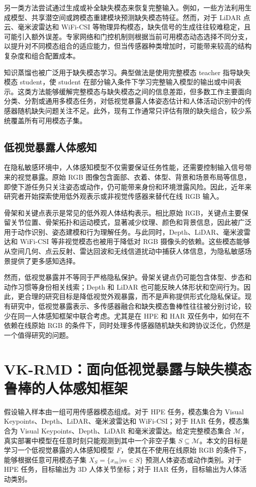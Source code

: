 \documentclass[journal]{IEEEtran}
\begin{document}
另一类方法尝试通过生成或补全缺失模态来恢复完整输入。例如，一些方法利用生成模型、共享潜空间或跨模态重建模块预测缺失模态特征。然而，对于 LiDAR 点云、毫米波雷达和 WiFi-CSI 等物理异构模态，缺失信号的生成往往较难稳定，且可能引入额外误差。专家网络和门控机制则根据当前可用模态动态选择不同分支，以提升对不同模态组合的适应能力，但当传感器种类增加时，可能带来较高的结构复杂度和组合配置成本。

知识蒸馏也被广泛用于缺失模态学习。典型做法是使用完整模态 teacher 指导缺失模态 student，使 student 在部分输入条件下学习完整输入模型的输出或中间表示。这类方法能够缓解完整模态与缺失模态之间的信息差距，但多数工作主要面向分类、分割或通用多模态任务，对低视觉暴露人体姿态估计和人体活动识别中的传感器随机缺失问题关注不足。此外，现有工作通常只评估有限的缺失组合，较少系统覆盖所有可用模态子集。

\subsection{低视觉暴露人体感知}

在隐私敏感环境中，人体感知模型不仅需要保证任务性能，还需要控制输入信号带来的视觉暴露。原始 RGB 图像包含面部、衣着、体型、背景和场景布局等信息，即使下游任务只关注姿态或动作，仍可能带来身份和环境泄露风险。因此，近年来研究者开始探索使用低外观表示或非视觉传感器来替代在线 RGB 输入。

骨架和关键点表示是常见的低外观人体结构表示。相比原始 RGB，关键点主要保留关节位置、骨架拓扑和运动模式，显著减少纹理、颜色和背景信息，因此被广泛用于动作识别、姿态建模和行为理解任务。与此同时，Depth、LiDAR、毫米波雷达和 WiFi-CSI 等非视觉模态也被用于降低对 RGB 摄像头的依赖。这些模态能够从空间几何、点云反射、雷达回波和无线信道扰动中捕获人体信息，为隐私敏感场景提供了更多感知选择。

然而，低视觉暴露并不等同于严格隐私保护。骨架关键点仍可能包含体型、步态和动作习惯等身份相关线索；Depth 和 LiDAR 也可能反映人体形状和空间行为。因此，更合理的研究目标是降低视觉外观暴露，而不是声称提供形式化隐私保证。现有研究中，低视觉暴露表示、多传感器融合和缺失模态鲁棒性往往被分别讨论，较少在同一人体感知框架中联合考虑。尤其是在 HPE 和 HAR 双任务中，如何在不依赖在线原始 RGB 的条件下，同时处理多传感器随机缺失和跨协议泛化，仍然是一个值得研究的问题。

\section{VK-RMD：面向低视觉暴露与缺失模态鲁棒的人体感知框架}

假设输入样本由一组可用传感器模态组成。对于 HPE 任务，模态集合为 Visual Keypoints、Depth、LiDAR、毫米波雷达和 WiFi-CSI；对于 HAR 任务，模态集合为 Visual Keypoints、Depth、LiDAR 和毫米波雷达。给定完整模态集合 $\mathcal{M}$，真实部署中模型在任意时刻只能观测到其中一个非空子集 $S \subseteq \mathcal{M}$。本文的目标是学习一个低视觉暴露的人体感知模型 $F$，使其在不使用在线原始 RGB 的条件下，能够根据任意可用模态子集 $X_S=\{x_m|m\in S\}$ 预测人体姿态或动作类别。对于 HPE 任务，目标输出为 3D 人体关节坐标；对于 HAR 任务，目标输出为人体活动类别。
\end{document}
